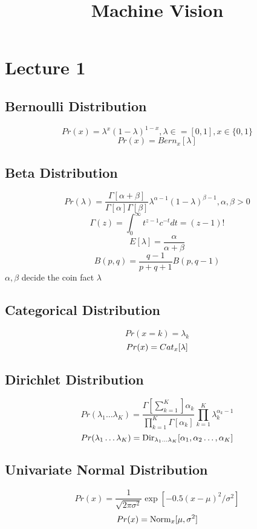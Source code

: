 \documentclass[12pt,a4paper]{article}
\title{Machine Vision}
\begin{document}
 

\baselineskip24pt
\maketitle 

\section{Lecture 1}
\subsection*{Bernoulli Distribution}

$$
Pr(x) = {\lambda}^x(1-\lambda)^{1-x}, \lambda \in =[0,1], x\in\{0,1\}
$$
$$
Pr(x) = Bern_x[\lambda]
$$
\subsection*{Beta Distribution}
$$
Pr(\lambda) = \frac{\Gamma[\alpha+\beta]}{\Gamma[\alpha]\Gamma[\beta]}\lambda^{\alpha-1}(1-\lambda)^{\beta-1},\alpha,\beta>0
$$
$$
\Gamma(z) = \int_{0}^{\infty}t^{z-1}c^{-t}dt=(z-1)!
$$
$$
E[\lambda] = \frac{\alpha}{\alpha+\beta}
$$
$$
B(p,q) = \frac{q-1}{p+q+1}B(p,q-1)
$$
$\alpha,\beta$ decide the coin fact $\lambda$
\subsection*{Categorical Distribution}
$$
Pr(x=k)=\lambda_k
$$
$$
Pr(x) = Cat_x[{\bf \lambda}]
$$
\subsection*{Dirichlet Distribution}
$$
Pr(\lambda_1\ldots\lambda_K) = \frac{\Gamma[\sum_{k=1}^{K}]\alpha_k}{\prod_{k=1}^{K}\Gamma[\alpha_k]}\prod_{k=1}^{K}\lambda_k^{\alpha_k-1}
$$
$$
Pr(\lambda_1\ldots\lambda_K) = {\rm Dir}_{\lambda_1\ldots\lambda_K}[\alpha_1,\alpha_2\ldots,\alpha_K]
$$
\subsection*{Univariate Normal Distribution}
$$
Pr(x) = \frac{1}{\sqrt{2\pi\sigma^2}}\exp[-0.5(x-\mu)^2/\sigma^2]
$$
$$
Pr(x) = {\rm Norm}_x[\mu,\sigma^2]
$$
\end{document}
